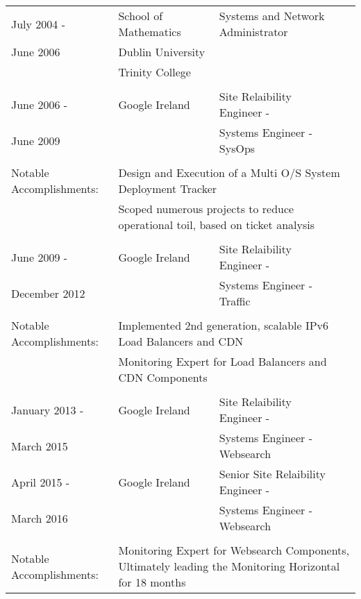 \documentclass[a4paper, 11pt] {article}
\begin{document}
\begin{tabular}{llll}
July 2004 -	& 	School of Mathematics	&  Systems and Network Administrator 	&			\\
June 2006	& 	Dublin University	&					&			\\
		& 	Trinity College		&					&			\\
		& 				&					&			\\
June 2006 - 	&	Google Ireland		&  Site Relaibility Engineer -		&	\hspace{10mm}	\\
June 2009 	&				&  Systems Engineer - SysOps       	&            		\\
      		&				&              				&            		\\
Notable Accomplishments: & \multicolumn{3}{l}{Design and Execution of a Multi O/S System Deployment Tracker} 	\\
			 & \multicolumn{3}{l}{Scoped numerous projects to reduce operational toil, based on ticket analysis}\\ 
		& 				&					&			\\
June 2009 - 	&	Google Ireland		&  Site Relaibility Engineer -		&	\hspace{10mm}	\\
December 2012 	&				&  Systems Engineer - Traffic       	&            		\\
      		&				&              				&            		\\
Notable Accomplishments: & \multicolumn{3}{l}{Implemented 2nd generation, scalable IPv6 Load Balancers and CDN} \\
			 & \multicolumn{3}{l}{Monitoring Expert for Load Balancers and CDN Components}	\\ 
		& 				&					&			\\
January 2013 -	&	Google Ireland		&  Site Relaibility Engineer -		&	\hspace{10mm}	\\
March 2015 	&				&  Systems Engineer - Websearch       	&            		\\
April 2015 -	&	Google Ireland		&  Senior Site Relaibility Engineer -	&	\hspace{10mm}	\\
March 2016 	&				&  Systems Engineer - Websearch       	&            		\\
      		&				&              				&            		\\
Notable Accomplishments: & \multicolumn{3}{l}{Monitoring Expert for Websearch Components, Ultimately leading the Monitoring Horizontal for 18 months} \\

\end{tabular}
\end{document}

